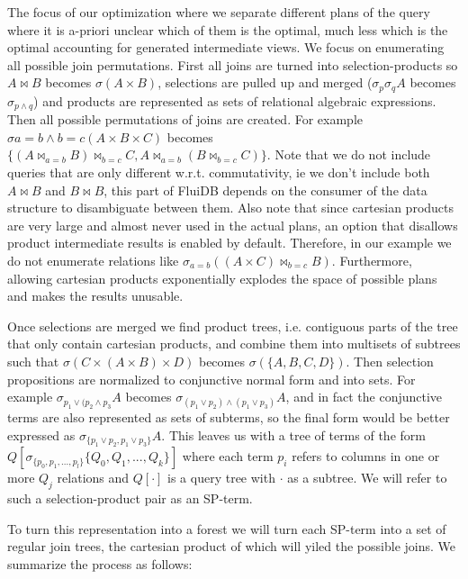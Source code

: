 The focus of our optimization where we separate different plans of the
query where it is a-priori unclear which of them is the optimal, much
less which is the optimal accounting for generated intermediate
views. We focus on enumerating all possible join permutations. First
all joins are turned into selection-products so \(A \Join B\) becomes
\(\sigma(A \times B)\), selections are pulled up and merged
(\(\sigma_p \sigma_q A\) becomes \(\sigma_{p \land q}\)) and products
are represented as sets of relational algebraic expressions. Then all
possible permutations of joins are created. For example
\(\sigma{a=b \land b=c}(A \times B \times C)\) becomes
\(\{(A \Join_{a=b} B) \Join_{b=c} C, A \Join_{a=b} (B \Join_{b=c}
C)\}\). Note that we do not include queries that are only different
w.r.t. commutativity, ie we don't include both \(A \Join B\) and
\(B \Join B\), this part of FluiDB depends on the consumer of the data
structure to disambiguate between them. Also note that since cartesian
products are very large and almost never used in the actual plans, an
option that disallows product intermediate results is enabled by
default. Therefore, in our example we do not enumerate relations like
\(\sigma_{a=b}((A \times C) \Join_{b=c}B)\). Furthermore, allowing
cartesian products exponentially explodes the space of possible plans
and makes the results unusable.

Once selections are merged we find product trees, i.e. contiguous parts
of the tree that only contain cartesian products, and combine them
into multisets of subtrees such that \(\sigma(C \times (A \times B)
\times D)\) becomes \(\sigma(\{A,B,C,D\})\). Then selection propositions
are normalized to conjunctive normal form and into sets. For example
\(\sigma_{p_1 \lor (p_2 \land p_3}A\) becomes \(\sigma_{(p_1 \lor p_2)
  \land (p_1 \lor p_3)}A\), and in fact the conjunctive terms are also
represented as sets of subterms, so the final form would be better
expressed as \(\sigma_{\{p_1 \lor p_2,p_1 \lor p_3\}}A\). This leaves us
with a tree of terms of the form
\(Q[\sigma_{\{p_0,p_1,...,p_l\}}\{Q_0,Q_1,...,Q_k\}]\) where each term
\(p_i\) refers to columns in one or more \(Q_j\) relations and
\(Q[\cdot]\) is a query tree with \(\cdot\) as a subtree. We will
refer to such a selection-product pair as an SP-term.

To turn this representation into a forest we will turn each SP-term
into a set of regular join trees, the cartesian product of which will
yiled the possible joins. We summarize the process as follows:

